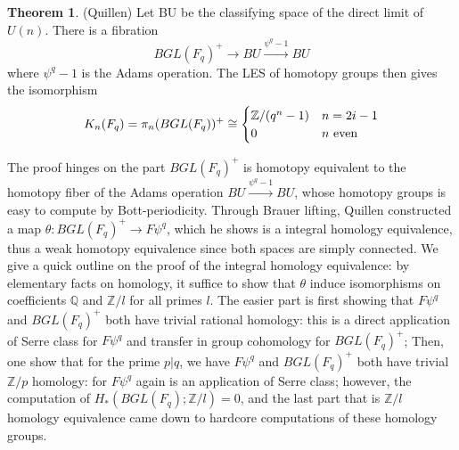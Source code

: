 \documentclass{article}
\theoremstyle{definition}
\newtheorem{theorem}{Theorem}[section]
\theoremstyle{definition}
\theoremstyle{definition}
\theoremstyle{definition}
\theoremstyle{definition}
\theoremstyle{definition}
\theoremstyle{definition}
\begin{document}
\begin{tcolorbox}[colback=red!5!white,colframe=red!30!white]
\begin{theorem}
    (Quillen) Let BU be the classifying space of the direct limit of $U(n)$. There is a fibration
    \[
    BGL(F_q)^+\xrightarrow{}BU\xrightarrow{\psi^q-1}BU
    \]
    where $\psi^q-1$ is the Adams operation. The LES of homotopy groups then gives the isomorphism
    \[
    K_n(F_q)=\pi_n(BGL(F_q))^+\cong
    \begin{cases}
    \mathbb{Z}/(q^n-1)& n=2i-1\\
    0& n \textup{ even}
    \end{cases}
    \]
\end{theorem}
\end{tcolorbox}
The proof hinges on the part $BGL(F_q)^+$ is homotopy equivalent to the homotopy fiber of the Adams operation $BU\xrightarrow{\psi^q-1}BU$, whose homotopy groups is easy to compute by Bott-periodicity. Through Brauer lifting, Quillen constructed a map $\theta: BGL(F_q)^+\to F\psi^q$, which he shows is a integral homology equivalence, thus a weak homotopy equivalence since both spaces are simply connected. We give a quick outline on the proof of the integral homology equivalence: by elementary facts on homology, it suffice to show that $\theta$ induce isomorphisms on coefficients $\mathbb{Q}$ and $\mathbb{Z}/l$ for all primes $l$. The easier part is first showing that $F\psi^q$ and $BGL(F_q)^+$ both have trivial rational homology: this is a direct application of Serre class for $F\psi^q$ and transfer in group cohomology for $BGL(F_q)^+$; Then, one show that for the prime $p|q$, we have $F\psi^q$ and $BGL(F_q)^+$ both have trivial $\mathbb{Z}/p$ homology: for $F\psi^q$ again is an application of Serre class; however, the computation of $H_*(BGL(F_q); \mathbb{Z}/l)=0$, and  the last part that is $\mathbb{Z}/l$ homology equivalence came down to hardcore computations of these homology groups. 
\end{document}
